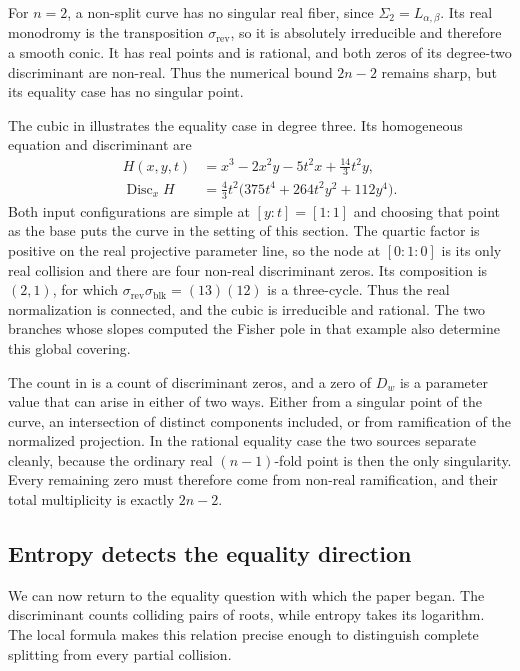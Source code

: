 \documentclass[12pt,reqno]{amsart}
\theoremstyle{definition}
\theoremstyle{remark}
\begin{document}
For \(n=2\), a non-split curve has no singular real fiber, since
\(\Sigma_2=L_{\alpha,\beta}\).  Its real monodromy is the
transposition \(\sigma_{\mathrm{rev}}\), so it is absolutely irreducible and therefore
a smooth conic.  It has real points and is rational, and both zeros
of its degree-two discriminant are non-real.  Thus the numerical bound
\(2n-2\) remains sharp, but its equality case has no singular point.

The cubic in  illustrates the equality
case in degree three.  Its homogeneous equation and discriminant are
\begin{align*}
 H(x,y,t)&=x^3-2x^2y-5t^2x+\frac{14}{3}t^2y,\\
 \operatorname{Disc}_xH&=\frac43t^2
       \bigl(375t^4+264t^2y^2+112y^4\bigr).
\end{align*}
Both input configurations are simple at \([y:t]=[1:1]\) and choosing
that point as the base puts the curve in the setting of this section.
The quartic factor is positive on the real projective parameter line,
so the node at \([0:1:0]\) is its only real collision and there are
four non-real discriminant zeros.  Its composition is \((2,1)\), for
which \(\sigma_{\mathrm{rev}}\sigma_{\mathrm{blk}}=(13)(12)\) is a three-cycle.  Thus the real normalization
is connected, and the cubic is irreducible and rational.  The two
branches whose slopes computed the Fisher pole in that example also
determine this global covering.

The count in  is a count of discriminant zeros, and a zero of \(D_w\) is a parameter value that can arise in either of two ways. Either from a singular point of the curve, an intersection of distinct components included, or from ramification of the normalized projection. In the rational equality case the two sources separate cleanly, because the ordinary real \((n-1)\)-fold point is then the only singularity. Every remaining zero must therefore come from non-real ramification, and their total multiplicity is exactly \(2n-2\).



\subsection{Entropy detects the equality direction}
\label{sec:entropy-detects-equality}

We can now return to the equality question with which the paper began.
The discriminant counts colliding pairs of roots, while entropy takes
its logarithm. The local formula makes this relation precise enough
to distinguish complete splitting from every partial collision.
\end{document}
